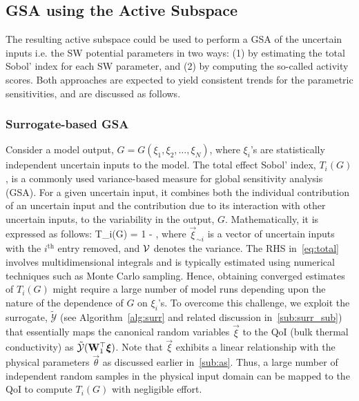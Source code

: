\subsection{GSA using the Active Subspace}
\label{sub:scores} 

The resulting active subspace could be used to perform a GSA of the uncertain inputs i.e. the SW potential
parameters in two ways: (1) by estimating the total Sobol' index for each SW parameter, and (2) by computing
the so-called activity scores. Both approaches are expected to yield consistent trends for the parametric 
sensitivities, and are discussed as follows. 

\subsubsection{Surrogate-based GSA}
\label{subsub:gsa_surr}

Consider a model output, $G= G(\xi_1,\xi_2,\ldots,\xi_N)$, where $\xi_i$'s are statistically independent uncertain
inputs to the model. The total effect Sobol' index, $T_i(G)$, is a commonly used 
variance-based measure for global sensitivity 
analysis (GSA). For a given uncertain input, it combines both the individual contribution of an uncertain input and the
contribution due to its interaction with other uncertain inputs, to the variability in the output, $G$. Mathematically, it is 
expressed as follows:
%
\be
T_i(G) = 1 - 
,
\label{eq:total}
\ee
%
where $\vec{\xi}_{\sim i}$ is a vector of uncertain inputs with the  $i^\text{th}$ entry removed, and $\mathcal{V}$ denotes the 
variance. The RHS in~\eqref{eq:total} involves multidimensional integrals and is typically estimated using numerical
techniques such as Monte Carlo sampling. Hence, obtaining converged estimates of $T_i(G)$ might require a large 
number of model runs depending upon the nature of the dependence of $G$ on $\xi_i$'s. To overcome this challenge,
we exploit the surrogate, $\tilde{\mathcal{Y}}$ (see Algorithm~\ref{alg:surr} and related discussion in~\ref{sub:surr_sub})
that essentially maps the canonical random variables $\vec{\xi}$ to the QoI (bulk thermal conductivity) as 
$\tilde{\mathcal{Y}}(\mat{W}_1^\top\vec{\xi})$. Note that $\vec{\xi}$ exhibits a linear
relationship with the physical parameters $\vec{\theta}$ as discussed earlier in~\ref{sub:as}.
Thus, a large number of
independent random samples in the physical input domain can be mapped to the QoI to compute $T_i(G)$
with negligible effort. 

